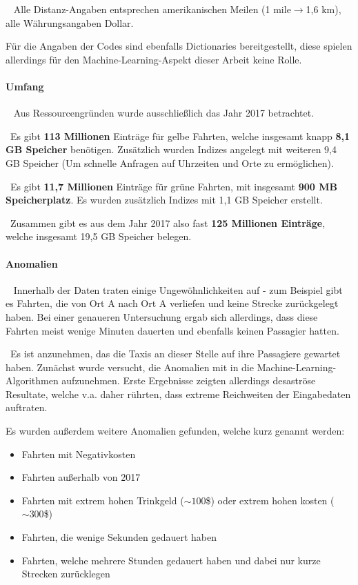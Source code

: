 ~\newline
Alle Distanz-Angaben entsprechen amerikanischen Meilen (1 mile$ \rightarrow $1,6 km), alle Währungsangaben Dollar. 

Für die Angaben der Codes sind ebenfalls Dictionaries bereitgestellt, diese spielen allerdings für den Machine-Learning-Aspekt dieser Arbeit keine Rolle.
\paragraph{Umfang} ~\newline
Aus Ressourcengründen wurde ausschließlich das Jahr 2017 betrachtet. 

~\newline Es gibt \textbf{113 Millionen} Einträge für gelbe Fahrten, welche insgesamt knapp \textbf{8,1 GB Speicher} benötigen. Zusätzlich wurden Indizes angelegt mit weiteren 9,4 GB Speicher (Um schnelle Anfragen auf Uhrzeiten und Orte zu ermöglichen).

~\newline Es gibt \textbf{11,7 Millionen} Einträge für grüne Fahrten, mit insgesamt \textbf{900 MB Speicherplatz}. Es wurden zusätzlich Indizes mit 1,1 GB Speicher erstellt. 

~\newline Zusammen gibt es aus dem Jahr 2017 also fast \textbf{125 Millionen Einträge}, welche insgesamt 19,5 GB Speicher belegen.
\paragraph{Anomalien} ~\newline
Innerhalb der Daten traten einige Ungewöhnlichkeiten auf - zum Beispiel gibt es Fahrten, die von Ort A nach Ort A verliefen und keine Strecke zurückgelegt haben. Bei einer genaueren Untersuchung ergab sich allerdings, dass diese Fahrten meist wenige Minuten dauerten und ebenfalls keinen Passagier hatten. 

~\newline Es ist anzunehmen, das die Taxis an dieser Stelle auf ihre Passagiere gewartet haben. Zunächst wurde versucht, die Anomalien mit in die Machine-Learning-Algorithmen aufzunehmen. Erste Ergebnisse zeigten allerdings desaströse Resultate, welche v.a. daher rührten, dass extreme Reichweiten der Eingabedaten auftraten. 

Es wurden außerdem weitere Anomalien gefunden, welche kurz genannt werden:
\begin{itemize}
	\item Fahrten mit Negativkosten
	\item Fahrten außerhalb von 2017
	\item Fahrten mit extrem hohen Trinkgeld ($\sim 100$\$) oder extrem hohen kosten ($\sim300$\$)
	\item Fahrten, die wenige Sekunden gedauert haben
	\item Fahrten, welche mehrere Stunden gedauert haben und dabei nur kurze Strecken zurücklegen
\end{itemize}

